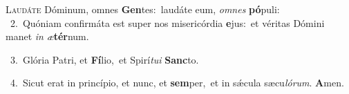 \lettrine{\initial\textcolor{\initialcolor}{L}}{audáte} Dóminum, omnes \textbf{Gen}\-tes:~\star laudáte eum, \textit{om}\-\textit{nes} \textbf{pó}\-puli:\\
{\numbfont\textcolor{\numbcolor}{~2.}}~Quóniam confirmáta est super nos misericórdia \textbf{e}\-jus:~\star et véritas Dómini manet \textit{in} \textit{æ}\-\textbf{tér}num.\par
{\numbfont\textcolor{\numbcolor}{~3.}}~Glória Patri, et \textbf{Fí}\-lio,~\star et Spirí\-\textit{tu}\-\textit{i} \textbf{Sanc}\-to.\par
{\numbfont\textcolor{\numbcolor}{~4.}}~Sicut erat in princípio, et nunc, et \textbf{sem}\-per,~\star et in sǽcula sæcu\-\textit{ló}\-\textit{rum}. \textbf{A}\-men.\par
